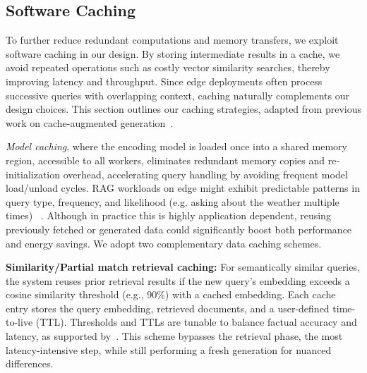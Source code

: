 \subsection{Software Caching}
\label{sec:software-caching}
To further reduce redundant computations and memory transfers, we exploit software caching in our design. By storing intermediate results in a cache, we avoid repeated operations such as costly vector similarity searches, thereby improving latency and throughput. Since edge deployments often process successive queries with overlapping context, caching naturally complements our design choices. This section outlines our caching strategies, adapted from previous work on cache-augmented generation~\cite{chan2024don}.


\textit{Model caching}, where the encoding model is loaded once into a shared memory region, accessible to all workers, eliminates redundant memory copies and re-initialization overhead, accelerating query handling by avoiding frequent model load/unload cycles.
RAG workloads on edge might exhibit predictable patterns in query type, frequency, and likelihood (e.g. asking about the weather multiple times)
~\cite{EdgeRAG}. Although in practice this is highly application dependent, reusing previously fetched or generated data could significantly boost both performance and energy savings. We adopt two complementary data caching schemes.


\noindent\textbf{Similarity/Partial match retrieval caching:}  
For semantically similar queries, the system reuses prior retrieval results if the new query’s embedding exceeds a cosine similarity threshold (e.g., 90\%) with a cached embedding. Each cache entry stores the query embedding, retrieved documents, and a user-defined time-to-live (TTL). Thresholds and TTLs are tunable to balance factual accuracy and latency, as supported by~\cite{simThreshold, simThreshold2}. This scheme bypasses the retrieval phase, the most latency-intensive step, while still performing a fresh generation for nuanced differences.

